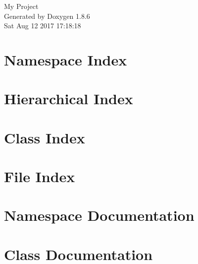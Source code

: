 \documentclass[twoside]{book}
\newcommand{\clearemptydoublepage}{%
  \newpage{\pagestyle{empty}\cleardoublepage}%
}
\begin{document}
\hypersetup{pageanchor=false}
\begin{titlepage}
\vspace*{7cm}
\begin{center}%
{\Large My Project }\\
\vspace*{1cm}
{\large Generated by Doxygen 1.8.6}\\
\vspace*{0.5cm}
{\small Sat Aug 12 2017 17:18:18}\\
\end{center}
\end{titlepage}
\clearemptydoublepage
\tableofcontents
\clearemptydoublepage
{}
\hypersetup{pageanchor=true}

\chapter{Namespace Index}

\chapter{Hierarchical Index}

\chapter{Class Index}

\chapter{File Index}

\chapter{Namespace Documentation}


\chapter{Class Documentation}















\end{document}

